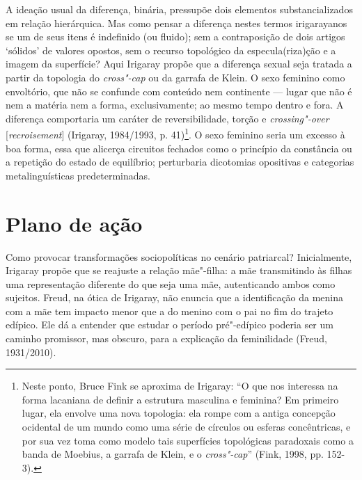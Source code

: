 A ideação usual da diferença, binária, pressupõe dois elementos
substancializados em relação hierárquica. Mas como pensar a diferença
nestes termos irigarayanos se um de seus itens é indefinido (ou fluido);
sem a contraposição de dois artigos `sólidos' de valores opostos, sem o
recurso topológico da especula(riza)ção e a imagem da superfície? Aqui
Irigaray propõe que a diferença sexual seja tratada a partir da
topologia do \emph{cross"-cap} ou da garrafa de Klein. O sexo feminino
como envoltório, que não se confunde com conteúdo nem continente ---
lugar que não é nem a matéria nem a forma, exclusivamente; ao mesmo
tempo dentro e fora. A diferença comportaria um caráter de
reversibilidade, torção e \emph{crossing"-over} {[}\emph{recroisement}{]}
(Irigaray, 1984/1993, p. 41)\footnote{Neste ponto, Bruce Fink se
  aproxima de Irigaray: ``O que nos interessa na forma lacaniana de
  definir a estrutura masculina e feminina? Em primeiro lugar, ela
  envolve uma nova topologia: ela rompe com a antiga concepção ocidental
  de um mundo como uma série de círculos ou esferas concêntricas, e por
  sua vez toma como modelo tais superfícies topológicas paradoxais como
  a banda de Moebius, a garrafa de Klein, e o \emph{cross"-cap}'' (Fink,
  1998, pp. 152-3).}. O sexo feminino seria um excesso à boa forma, essa
que alicerça circuitos fechados como o princípio da constância ou a
repetição do estado de equilíbrio; perturbaria dicotomias opositivas e
categorias metalinguísticas predeterminadas.

\section{Plano de ação}

Como provocar transformações sociopolíticas no cenário patriarcal?
Inicialmente, Irigaray propõe que se reajuste a relação mãe"-filha: a mãe
transmitindo às filhas uma representação diferente do que seja uma mãe,
autenticando ambos como sujeitos. Freud, na ótica de Irigaray, não
enuncia que a identificação da menina com a mãe tem impacto menor que a
do menino com o pai no fim do trajeto edípico. Ele dá a entender que
estudar o período pré"-edípico poderia ser um caminho promissor, mas
obscuro, para a explicação da feminilidade (Freud, 1931/2010).

